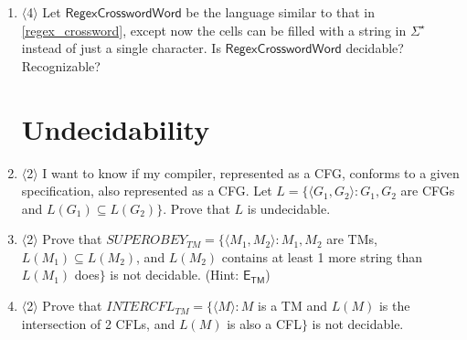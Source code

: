 \documentclass[]{article}
\newcommand{\Level}[1]{{\color{blue} $\langle$#1$\rangle$}}
\begin{document}
\begin{enumerate}
For example, here is a graphical representation of a possible input with $\Sigma = \{a, b\}$:

\begin{table}[!htb]
	\centering
	\begin{tabular}{llll}
		\cline{2-4}
		\multicolumn{1}{l|}{$(bba)^\star$} & \multicolumn{1}{l|}{} & \multicolumn{1}{l|}{} & \multicolumn{1}{l|}{} \\ \cline{2-4} 
		\multicolumn{1}{l|}{$b(a^\star b)^\star$} & \multicolumn{1}{l|}{} & \multicolumn{1}{l|}{} & \multicolumn{1}{l|}{} \\ \cline{2-4} 
		&     $(a \cup bb)^\star$                 &       $(ba)^\star ab$                &   $((ba)^\star \cup (ab)^\star)^\star$                
	\end{tabular}
\end{table}

Let the language $\textsf{RegexCrossword}$ be the set of all instances $\langle A, R_1, \cdots, R_m, C_1, \cdots, C_n\rangle$ where $A$ is an $m \times n$ grid, $R_1, \cdots, R_m, C_1, \cdots, C_n$ are regexes, and there is a solution to $A$ as described above. Show that $\textsf{RegexCrossword}$ is decidable. (Hint: brute-force.)

\item \Level{4} Let $\textsf{RegexCrosswordWord}$ be the language similar to that in \cref{regex_crossword}, except now the cells can be filled with a string in $\Sigma^\star$ instead of just a single character. Is $\textsf{RegexCrosswordWord}$ decidable? Recognizable? 

\section{Undecidability}

\item \Level{2} I want to know if my compiler, represented as a CFG, conforms to a given specification, also represented as a CFG. Let $L = \{\langle G_1, G_2 \rangle : G_1, G_2$ are CFGs and $L(G_1) \subseteq L(G_2)\}$. Prove that $L$ is undecidable.

\item \Level{2} Prove that $SUPEROBEY_{TM} = \{ \langle M_1, M_2 \rangle : M_1, M_2$ are TMs, $L(M_1) \subseteq L(M_2)$, and $L(M_2)$ contains at least 1 more string than $L(M_1)$ does$\}$ is not decidable. (Hint: $\mathsf{E}_{\mathsf{TM}}$)

\item \Level{2} Prove that $INTERCFL_{TM} = \{ \langle M \rangle : M$ is a TM and $L(M)$ is the intersection of 2 CFLs, and $L(M)$ is also a CFL$\}$ is not decidable.


\end{enumerate}
\end{document}
